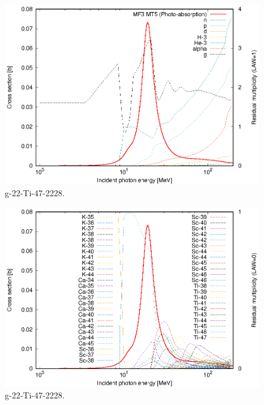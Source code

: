 \begin{figure}
 \includegraphics[width=\linewidth]{eps/g_22-Ti-47_2228.eps}
  \caption{g-22-Ti-47-2228.}
\end{figure}
\begin{figure}
 \includegraphics[width=\linewidth]{eps-law0/g_22-Ti-47_2228.eps}
 \caption{g-22-Ti-47-2228.}
\end{figure}
\newpage \clearpage

